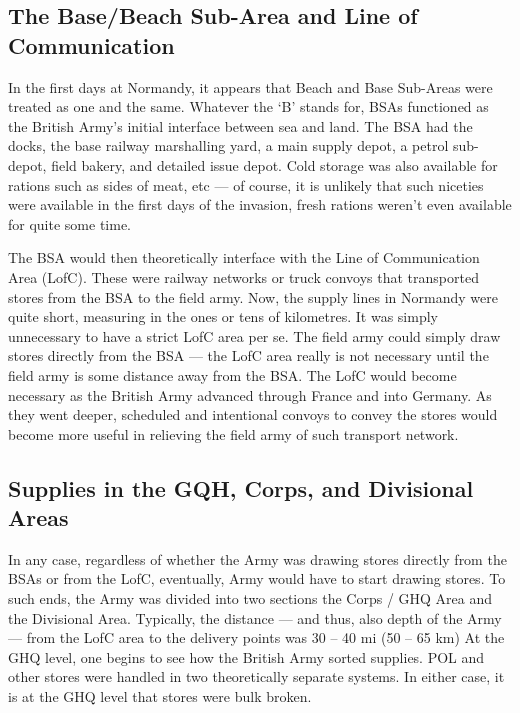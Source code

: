 \documentclass[noraggedright]{turabian-researchpaper}
\begin{document}
\subsection{The Base/Beach Sub-Area and Line of Communication}

In the first days at 
Normandy, it appears that Beach and  Base Sub-Areas were treated as one and
the same.  Whatever the `B' stands for, BSAs functioned as the British Army's
initial interface between sea and land.  The BSA had %
the docks, the base railway marshalling yard, a main supply depot, a petrol
sub-depot, field bakery, and detailed issue depot. Cold storage was also 
available for rations such as sides of meat, etc --- of course, it is unlikely
that such niceties were available in the first days of the invasion, fresh
rations weren't even available for quite some time. %

The BSA would then theoretically interface with the Line of Communication
Area (LofC).  These were railway networks or truck convoys that transported
stores from the BSA to the field army.  Now, the supply lines in Normandy were
quite short, measuring in the ones or tens of kilometres.  It was simply 
unnecessary to have a strict LofC area per se.  The field army could simply
draw stores directly from the BSA --- the LofC area really is not necessary
until the field army is some distance away from the BSA.  The LofC would 
become necessary as the British Army advanced through France and into 
Germany.  As they went deeper, scheduled and intentional convoys to convey
the stores would become more useful in relieving the field army of such 
transport network.  

\subsection{Supplies in the GQH, Corps, and Divisional Areas}

In any case, regardless of whether the Army was drawing stores directly from 
the BSAs or from the LofC, eventually,  Army would have to start drawing
stores.  To such ends, the Army was divided into two sections the 
Corps / GHQ Area and the Divisional Area.  Typically, the distance --- and 
thus, also depth of the Army --- from the LofC area to the delivery points
was 30 -- 40 mi (50 -- 65 km)  At the GHQ level, one begins to
see how the British Army sorted supplies.  POL and other stores were handled
in two theoretically separate systems.  In either case, it is at the GHQ level
that stores were bulk broken.  
\end{document}
